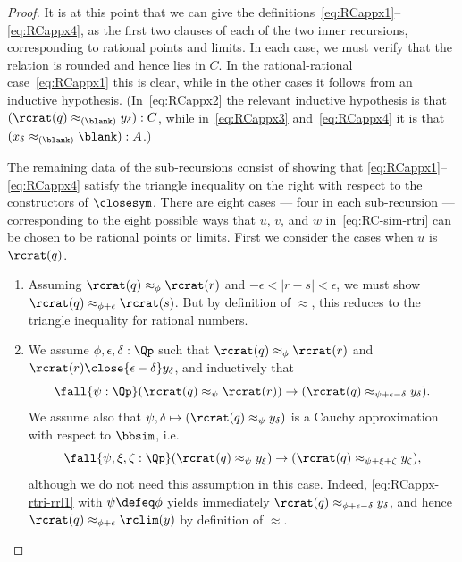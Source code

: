 \begin{proof}
  It is at this point that we can give the definitions~\eqref{eq:RCappx1}--\eqref{eq:RCappx4}, as the first two clauses of each of the two inner recursions, corresponding to rational points and limits.
  In each case, we must verify that the relation is rounded and hence lies in $C$.
  In the rational-rational case~\eqref{eq:RCappx1} this is clear, while in the other cases it follows from an inductive hypothesis.
  (In~\eqref{eq:RCappx2} the relevant inductive hypothesis is that $(\rcrat(q) \approx_{(\blank)} y_\delta) : C$, while in~\eqref{eq:RCappx3} and~\eqref{eq:RCappx4} it is that $(x_\delta \approx_{(\blank)} \blank) : A$.)

  The remaining data of the sub-recursions consist of showing that \eqref{eq:RCappx1}--\eqref{eq:RCappx4} satisfy the triangle inequality on the right with respect to the constructors of $\closesym$.
  There are eight cases --- four in each sub-recursion --- corresponding to the eight possible ways that $u$, $v$, and $w$ in~\eqref{eq:RC-sim-rtri} can be chosen to be rational points or limits.
  First we consider the cases when $u$ is $\rcrat(q)$.
  \begin{enumerate}
  \item Assuming $\rcrat(q)\approx_\phi \rcrat(r)$ and $-\epsilon<|r-s|<\epsilon$, we must show $\rcrat(q)\approx_{\phi+\epsilon} \rcrat(s)$.
    But by definition of $\approx$, this reduces to the triangle inequality for rational numbers.
  \item We assume $\phi,\epsilon,\delta:\Qp$ such that $\rcrat(q)\approx_\phi \rcrat(r)$ and $\rcrat(r) \close{\epsilon-\delta} y_\delta$, and inductively that
    \begin{equation}
      \fall{\psi:\Qp}(\rcrat(q) \approx_{\psi} \rcrat(r)) \to (\rcrat(q) \approx_{\psi+\epsilon-\delta} y_\delta).\label{eq:RCappx-rtri-rrl1}
    \end{equation}
    We assume also that $\psi,\delta\mapsto (\rcrat(q) \approx_{\psi} y_\delta)$ is a Cauchy approximation with respect to $\bbsim$, i.e.\
    \begin{equation}
      \fall{\psi,\xi,\zeta:\Qp} (\rcrat(q) \approx_{\psi} y_\xi) \to (\rcrat(q) \approx_{\psi+\xi+\zeta} y_\zeta),\label{eq:RCappx-rtri-rrl2}
    \end{equation}
    although we do not need this assumption in this case.
    Indeed, \eqref{eq:RCappx-rtri-rrl1} with $\psi\defeq \phi$ yields immediately $\rcrat(q) \approx_{\phi+\epsilon-\delta} y_\delta$, and hence $\rcrat(q) \approx_{\phi+\epsilon} \rclim(y)$ by definition of $\approx$.

\end{enumerate}
\end{proof}
